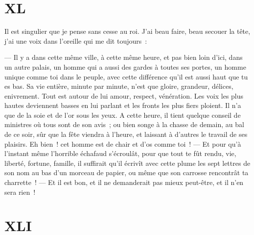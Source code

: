 \documentclass[french,twoside]{book} %
\begin{document}
 \section[{XL}]{XL}
\label{ch40}\renewcommand{\leftmark}{XL}

\noindent Il est singulier que je pense sans cesse au roi. J’ai beau faire, beau secouer la tête, j’ai une voix dans l’oreille qui me dit toujours :\par
— Il y a dans cette même ville, à cette même heure, et pas bien loin d’ici, dans un autre palais, un homme qui a aussi des gardes à toutes ses portes, un homme unique comme toi dans le peuple, avec cette différence qu’il est aussi haut que tu es bas. Sa vie entière, minute par minute, n’est que gloire, grandeur, délices, enivrement. Tout est autour de lui amour, respect, vénération. Les voix les plus hautes deviennent basses en lui parlant et les fronts les plus fiers ploient. Il n’a que de la soie et de l’or sous les yeux. A cette heure, il tient quelque conseil de ministres où tous sont de son avis ; ou bien songe à la chasse de demain, au bal de ce soir, sûr que la fête viendra à l’heure, et laissant à d’autres le travail de ses plaisirs. Eh bien ! cet homme est de chair et d’os comme toi !  — Et pour qu’à l’instant même l’horrible échafaud s’écroulât, pour que tout te fût rendu, vie, liberté, fortune, famille, il suffirait qu’il écrivît avec cette plume les sept lettres de son nom au bas d’un morceau de papier, ou même que son carrosse rencontrât ta charrette ! — Et il est bon, et il ne demanderait pas mieux peut-être, et il n’en sera rien !
 \section[{XLI}]{XLI}
\label{ch41}\renewcommand{\leftmark}{XLI}
\end{document}
